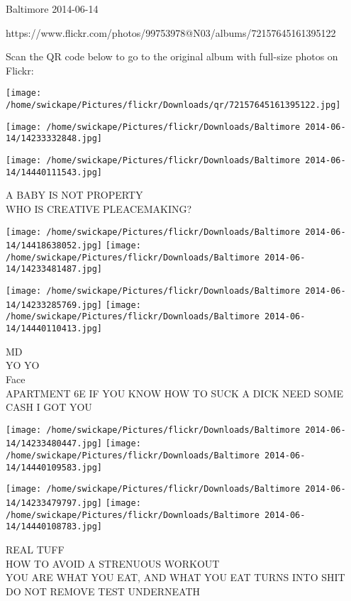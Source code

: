\documentclass[10pt,letterpaper]{article}
\begin{document}
Baltimore 2014-06-14

https://www.flickr.com/photos/99753978@N03/albums/72157645161395122

Scan the QR code below to go to the original album with full-size photos on Flickr:

\texttt{[image: /home/swickape/Pictures/flickr/Downloads/qr/72157645161395122.jpg]}
\pagebreak

\texttt{[image: /home/swickape/Pictures/flickr/Downloads/Baltimore 2014-06-14/14233332848.jpg]}

\vspace{0.25in}
\texttt{[image: /home/swickape/Pictures/flickr/Downloads/Baltimore 2014-06-14/14440111543.jpg]}

A BABY IS NOT PROPERTY\\
WHO IS CREATIVE PLEACEMAKING?\\
\pagebreak

\texttt{[image: /home/swickape/Pictures/flickr/Downloads/Baltimore 2014-06-14/14418638052.jpg]}
\texttt{[image: /home/swickape/Pictures/flickr/Downloads/Baltimore 2014-06-14/14233481487.jpg]}

\texttt{[image: /home/swickape/Pictures/flickr/Downloads/Baltimore 2014-06-14/14233285769.jpg]}
\texttt{[image: /home/swickape/Pictures/flickr/Downloads/Baltimore 2014-06-14/14440110413.jpg]}

MD\\
YO YO\\
Face\\
APARTMENT 6E IF YOU KNOW HOW TO SUCK A DICK NEED SOME CASH I GOT YOU\\
\pagebreak

\texttt{[image: /home/swickape/Pictures/flickr/Downloads/Baltimore 2014-06-14/14233480447.jpg]}
\texttt{[image: /home/swickape/Pictures/flickr/Downloads/Baltimore 2014-06-14/14440109583.jpg]}

\texttt{[image: /home/swickape/Pictures/flickr/Downloads/Baltimore 2014-06-14/14233479797.jpg]}
\texttt{[image: /home/swickape/Pictures/flickr/Downloads/Baltimore 2014-06-14/14440108783.jpg]}

REAL TUFF\\
HOW TO AVOID A STRENUOUS WORKOUT\\
YOU ARE WHAT YOU EAT, AND WHAT YOU EAT TURNS INTO SHIT\\
DO NOT REMOVE TEST UNDERNEATH\\
\pagebreak
\end{document}
